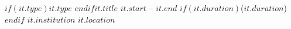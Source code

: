\cvitem
    {$if(it.type)$$it.type$ $endif$$it.title$}
    {$it.start$ -- $it.end$ $if(it.duration)$($it.duration$)$endif$}
    {$it.institution$}
    {$it.location$}
\vspace{10pt}\\
